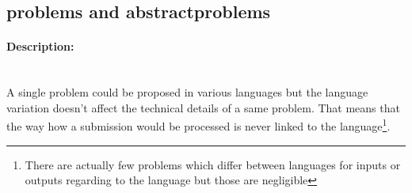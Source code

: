 
\newpage
\subsection{problems and abstractproblems} %
\label{sub:problems}
\begin{figure}
  \vspace{-20pt}
  \begin{center}
  \end{center}
  \vspace{-10pt}
\end{figure}

\paragraph{Description:}~\\ %
A single problem could be proposed in various languages but the language variation doesn't affect the technical details of a same problem. That means that the way how a submission would be processed is never linked to the language\footnote{There are actually few problems which differ between languages for inputs or outputs regarding to the language but those are negligible}.

\begin{figure}
  \vspace{-20pt}
  \begin{center}
  \end{center}
  \vspace{-20pt}
\end{figure}

